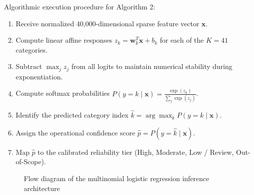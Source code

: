 \noindent Algorithmic execution procedure for Algorithm 2:
\begin{enumerate}
    \item Receive normalized 40,000-dimensional sparse feature vector $\mathbf{x}$.
    \item Compute linear affine responses $z_k = \mathbf{w}_k^T \mathbf{x} + b_k$ for each of the $K = 41$ categories.
    \item Subtract $\max_j z_j$ from all logits to maintain numerical stability during exponentiation.
    \item Compute softmax probabilities $P(y = k \mid \mathbf{x}) = \frac{\exp(z_k)}{\sum_j \exp(z_j)}$.
    \item Identify the predicted category index $\hat{k} = \arg\max_k P(y = k \mid \mathbf{x})$.
    \item Assign the operational confidence score $\hat{p} = P(y = \hat{k} \mid \mathbf{x})$.
    \item Map $\hat{p}$ to the calibrated reliability tier (High, Moderate, Low / Review, Out-of-Scope).
\end{enumerate}

\begin{figure}[htbp]
\centering
{}
\caption{Flow diagram of the multinomial logistic regression inference architecture}\label{fig:tikz_logreg}
\end{figure}

